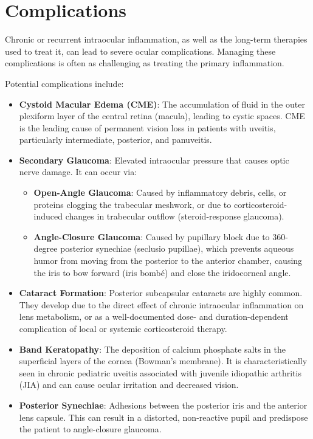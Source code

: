 \section*{Complications}
Chronic or recurrent intraocular inflammation, as well as the long-term therapies used to treat it, can lead to severe ocular complications. Managing these complications is often as challenging as treating the primary inflammation.

Potential complications include:
\begin{itemize}
    \item \textbf{Cystoid Macular Edema (CME)}: The accumulation of fluid in the outer plexiform layer of the central retina (macula), leading to cystic spaces. CME is the leading cause of permanent vision loss in patients with uveitis, particularly intermediate, posterior, and panuveitis.
    \item \textbf{Secondary Glaucoma}: Elevated intraocular pressure that causes optic nerve damage. It can occur via:
    \begin{itemize}
        \item \textbf{Open-Angle Glaucoma}: Caused by inflammatory debris, cells, or proteins clogging the trabecular meshwork, or due to corticosteroid-induced changes in trabecular outflow (steroid-response glaucoma).
        \item \textbf{Angle-Closure Glaucoma}: Caused by pupillary block due to 360-degree posterior synechiae (seclusio pupillae), which prevents aqueous humor from moving from the posterior to the anterior chamber, causing the iris to bow forward (iris bombé) and close the iridocorneal angle.
    \end{itemize}
    \item \textbf{Cataract Formation}: Posterior subcapsular cataracts are highly common. They develop due to the direct effect of chronic intraocular inflammation on lens metabolism, or as a well-documented dose- and duration-dependent complication of local or systemic corticosteroid therapy.
    \item \textbf{Band Keratopathy}: The deposition of calcium phosphate salts in the superficial layers of the cornea (Bowman's membrane). It is characteristically seen in chronic pediatric uveitis associated with juvenile idiopathic arthritis (JIA) and can cause ocular irritation and decreased vision.
    \item \textbf{Posterior Synechiae}: Adhesions between the posterior iris and the anterior lens capsule. This can result in a distorted, non-reactive pupil and predispose the patient to angle-closure glaucoma.

\end{itemize}
